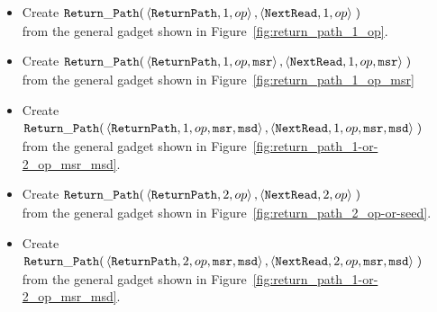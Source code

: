 \begin{itemize}

    \item Create
    $\begin{aligned}[t]
        {\tt Return\_Path}(& \left\langle {\tt ReturnPath}, 1, op \right\rangle,
                      \left\langle {\tt NextRead},   1, op \right\rangle \;)
    \end{aligned}$\\from the general gadget shown in Figure~\ref{fig:return_path_1_op}.

    \item Create
    $\begin{aligned}[t]
        {\tt Return\_Path}(& \left\langle {\tt ReturnPath}, 1, op, {\tt msr} \right\rangle,
                      \left\langle {\tt NextRead},   1, op, {\tt msr} \right\rangle \;)
    \end{aligned}$\\from the general gadget shown in Figure~\ref{fig:return_path_1_op_msr}

    \item Create
    $\begin{aligned}[t]
        {\tt Return\_Path}(& \left\langle {\tt ReturnPath}, 1, op, {\tt msr}, {\tt msd} \right\rangle,
                      \left\langle {\tt NextRead},   1, op, {\tt msr}, {\tt msd} \right\rangle \;)
    \end{aligned}$\\from the general gadget shown in Figure~\ref{fig:return_path_1-or-2_op_msr_msd}.


    \item Create
    $\begin{aligned}[t]
        {\tt Return\_Path}(& \left\langle {\tt ReturnPath}, 2, op \right\rangle,
                      \left\langle {\tt NextRead},   2, op \right\rangle \;)
    \end{aligned}$\\from the general gadget shown in Figure~\ref{fig:return_path_2_op-or-seed}.

    \item Create
    $\begin{aligned}[t]
        {\tt Return\_Path}(& \left\langle {\tt ReturnPath}, 2, op, {\tt msr}, {\tt msd} \right\rangle,
                      \left\langle {\tt NextRead},   2, op, {\tt msr}, {\tt msd} \right\rangle \;)
    \end{aligned}$\\from the general gadget shown in Figure~\ref{fig:return_path_1-or-2_op_msr_msd}.



\end{itemize}
